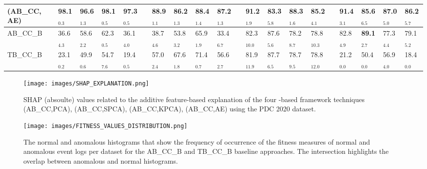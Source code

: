 \begin{table*}[!t]
{\begin{tabular}{llllllllllllllllllllll}
\multicolumn{2}{l}{(AB\_CC, AE)}       &  & \textbf{98.1$_{0.3}$} & \textbf{96.6$_{1.3}$} & \textbf{98.1$_{0.5}$} & \textbf{97.3$_{0.5}$} &  & \textbf{88.9$_{1.1}$} & \textbf{86.2$_{1.3}$} & \textbf{88.4$_{1.4}$} & \textbf{87.2$_{1.3}$} &  & \textbf{91.2$_{1.9}$} & 83.3$_{5.8}$          & \textbf{88.3$_{1.6}$} & \textbf{85.2$_{4.1}$} &  & 91.4$_{3.1}$          & 85.6$_{6.5}$          & 87.0$_{5.0}$          & 86.2$_{5.7}$          \\ \midrule
\multicolumn{2}{l}{AB\_CC\_B}          &  & 36.6$_{4.3}$          & 58.6$_{2.2}$          & 62.3$_{0.5}$          & 36.1$_{4.0}$          &  & 38.7$_{4.6}$          & 53.8$_{3.2}$          & 65.9$_{1.9}$          & 33.4$_{6.7}$          &  & 82.3$_{10.0}$         & 87.6$_{5.6}$          & 78.2$_{8.7}$          & 78.8$_{10.3}$         &  & 82.8$_{4.9}$          & \textbf{89.1$_{2.7}$} & 77.3$_{4.4}$          & 79.1$_{5.2}$          \\
\multicolumn{2}{l}{TB\_CC\_B}          &  & 23.1$_{0.2}$          & 49.9$_{0.6}$          & 54.7$_{7.6}$          & 19.4$_{0.5}$          &  & 57.0$_{2.4}$          & 67.6$_{1.8}$          & 71.4$_{0.7}$          & 56.6$_{2.7}$          &  & 81.9$_{11.9}$         & 87.7$_{6.5}$          & 78.7$_{9.5}$          & 78.8$_{12.0}$         &  & 21.2$_{0.0}$          & 50.4$_{0.0}$          & 56.9$_{4.0}$          & 18.4$_{0.0}$          \\ \bottomrule
\end{tabular}%
}
\end{table*}
\begin{figure*}[!t]
\centering
\texttt{[image: images/SHAP\_EXPLANATION.png]}
\caption{SHAP (absoulte) values related to the additive feature-based explanation of the four -based framework techniques (AB\_CC,PCA), (AB\_CC,SPCA), (AB\_CC,KPCA), (AB\_CC,AE) using the PDC 2020 dataset.}
\label{SHAP_EXPLANATION}
\end{figure*}

\begin{figure*}[!t]
\centering
\texttt{[image: images/FITNESS\_VALUES\_DISTRIBUTION.png]}
\caption{The normal and anomalous histograms that show the frequency of occurrence of the fitness measures of normal and anomalous event logs per dataset for the AB\_CC\_B and TB\_CC\_B baseline approaches. The intersection highlights the overlap between anomalous and normal histograms.}
\label{FITNESS_VALUES_DISTRIBUTION}
\end{figure*}


